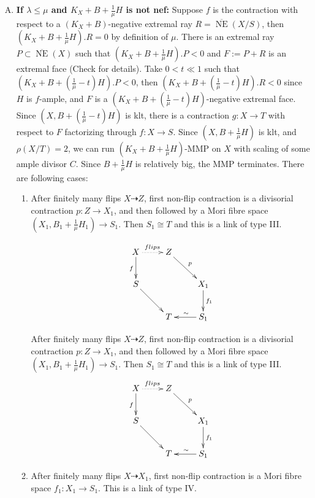 \documentclass{article}
\begin{document}
\begin{enumerate}[(A)]
  \item\label{a} \textbf{If $ \lambda\leqslant\mu $ and $ K_X+B+\frac{1}{\mu}H $ is not nef:} Suppose $ f $ is the contraction with respect to a $ (K_X+B) $-negative extremal ray $ R= \overline{\operatorname{ NE }}(X/S) $, then $ (K_X+B+\frac{1}{\mu}H).R=0 $ by definition of $ \mu $. There is an extremal ray $ P \subset \overline{\operatorname{ NE }}(X) $ such that $ (K_X+B+\frac{1}{\mu}H).P<0 $ and $ F:=P+R $ is an extremal face  (Check \cite[5.4.2]{cortiFactoringBirationalMaps} for details). Take  $ 0<t\ll 1 $ such that $ (K_X+B+(\frac{1}{\mu}-t)H).P<0 $, then $  (K_X+B+(\frac{1}{\mu}-t)H).R<0 $ since $H$ is $f$-ample, and $ F $ is a $  (K_X+B+(\frac{1}{\mu}-t)H) $-negative extremal face. Since $ (X,B+(\frac{1}{\mu}-t)H) $ is klt, there is  a contraction $ g:X\to T $ with respect  to $ F $ factorizing through $ f:X\to S $. Since  $ (X,B+\frac{1}{\mu}H) $ is klt, and $ \rho(X/T)=2 $,  we can  run $ (K_X+B+\frac{1}{\mu}H) $-MMP on $ X  $ with scaling of some ample divisor $C$.  Since $ B+\frac{1}{\mu}H $ is relatively big,  the MMP terminates. There are following cases: 
  \begin{enumerate}[1)]
    \item\label{a1} 
\begin{multicols}{2}       %
After finitely many flips $ X\dashrightarrow Z $, first non-flip contraction is a divisorial contraction $ p:Z\to X_1 $, and then followed by a Mori fibre space $(X_{1},B_{1}+\frac{1}{\mu}H_{1} )\to S_{1}$. Then  $S_{1} \cong T$ and this is a link of type III.     

      \[ \xymatrix{
      X\ar[d]_f\ar@{.>}[r]^{flips}&Z\ar[rd]^{p}&\\
      S\ar[dr]&&X_1\ar[d]^{f_1}\\
      &T&S_1\ar[l]_\sim}\]
\end{multicols}
After finitely many flips $ X\dashrightarrow Z $, first non-flip contraction is a divisorial contraction $ p:Z\to X_1 $, and then followed by a Mori fibre space $(X_{1},B_{1}+\frac{1}{\mu}H_{1} )\to S_{1}$. 
    Then  $S_{1} \cong T$ and this is a link of type III.     
      \[ \xymatrix{
      X\ar[d]_f\ar@{.>}[r]^{flips}&Z\ar[rd]^{p}&\\
      S\ar[dr]&&X_1\ar[d]^{f_1}\\
      &T&S_1\ar[l]_\sim}\]
    \item\label{a2}
      \begin{multicols}{2}
      After finitely many flips $ X\dashrightarrow X_1 $, first non-flip contraction is a Mori fibre space $ f_1:X_1\to S_{1} $. This is a link of type IV.  
      \end{multicols}



\end{enumerate}
\end{enumerate}
\end{document}
